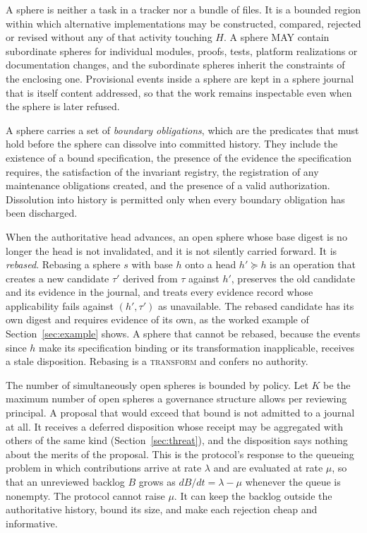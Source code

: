 \documentclass[11pt]{article}
\theoremstyle{remark}
\newcommand{\TRANSFORM}{\textsc{transform}}
\begin{document}
A sphere is neither a task in a tracker nor a bundle of files. It is a bounded region within which alternative implementations may be constructed, compared, rejected or revised without any of that activity touching $H$. A sphere MAY contain subordinate spheres for individual modules, proofs, tests, platform realizations or documentation changes, and the subordinate spheres inherit the constraints of the enclosing one. Provisional events inside a sphere are kept in a sphere journal that is itself content addressed, so that the work remains inspectable even when the sphere is later refused.

A sphere carries a set of \emph{boundary obligations}, which are the predicates that must hold before the sphere can dissolve into committed history. They include the existence of a bound specification, the presence of the evidence the specification requires, the satisfaction of the invariant registry, the registration of any maintenance obligations created, and the presence of a valid authorization. Dissolution into history is permitted only when every boundary obligation has been discharged.

When the authoritative head advances, an open sphere whose base digest is no longer the head is not invalidated, and it is not silently carried forward. It is \emph{rebased}. Rebasing a sphere $s$ with base $h$ onto a head $h'\succeq h$ is an operation that creates a new candidate $\tau'$ derived from $\tau$ against $h'$, preserves the old candidate and its evidence in the journal, and treats every evidence record whose applicability fails against $(h',\tau')$ as unavailable. The rebased candidate has its own digest and requires evidence of its own, as the worked example of Section~\ref{sec:example} shows. A sphere that cannot be rebased, because the events since $h$ make its specification binding or its transformation inapplicable, receives a stale disposition. Rebasing is a \TRANSFORM{} and confers no authority.

The number of simultaneously open spheres is bounded by policy. Let $K$ be the maximum number of open spheres a governance structure allows per reviewing principal. A proposal that would exceed that bound is not admitted to a journal at all. It receives a deferred disposition whose receipt may be aggregated with others of the same kind (Section~\ref{sec:threat}), and the disposition says nothing about the merits of the proposal. This is the protocol's response to the queueing problem in which contributions arrive at rate $\lambda$ and are evaluated at rate $\mu$, so that an unreviewed backlog $B$ grows as $dB/dt=\lambda-\mu$ whenever the queue is nonempty. The protocol cannot raise $\mu$. It can keep the backlog outside the authoritative history, bound its size, and make each rejection cheap and informative.
\end{document}
